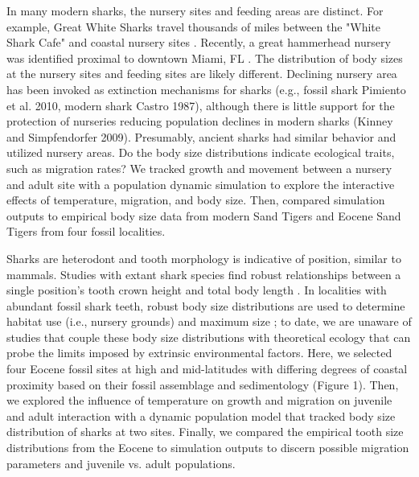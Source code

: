 \documentclass[]{rsos}%
\begin{document}
In many modern sharks, the nursery sites and feeding areas are distinct. 
For example, Great White Sharks travel thousands of miles between the "White Shark Cafe" and coastal nursery sites \cite{Jorgensen2010}. Recently, a great hammerhead nursery was identified proximal to downtown Miami, FL \cite{Macdonald2021}.
The distribution of body sizes at the nursery sites and feeding sites are likely different.
Declining nursery area has been invoked as extinction mechanisms for sharks (e.g., fossil shark Pimiento et al. 2010, modern shark Castro 1987), although there is little support for the protection of nurseries reducing population declines in modern sharks (Kinney and Simpfendorfer 2009).
Presumably, ancient sharks had similar behavior and utilized nursery areas.
Do the body size distributions indicate ecological traits, such as migration rates? 
We tracked growth and movement between a nursery and adult site with a  population dynamic simulation to explore the interactive effects of temperature, migration, and body size. 
Then, compared simulation outputs to empirical body size data from modern Sand Tigers and Eocene Sand Tigers from four fossil localities. 

Sharks are heterodont and tooth morphology is indicative of position, similar to mammals. 
Studies with extant shark species find robust relationships between a single position's tooth crown height and total body length \cite{Shimada2002, Shimada2004, Shimada2007}.  
In localities with abundant fossil shark teeth, robust body size distributions are used to determine habitat use (i.e., nursery grounds) and maximum size \cite{Pimiento2010, Shimada2020, Villafana2020}; to date, we are unaware of studies that couple these body size distributions with theoretical ecology that can probe the limits imposed by extrinsic environmental factors.
Here, we selected four Eocene fossil sites at high and mid-latitudes with differing degrees of coastal proximity based on their fossil assemblage and sedimentology (Figure 1).
Then, we explored the influence of temperature on growth and migration on  juvenile and adult interaction with a dynamic population model that tracked body size distribution of sharks at two sites.
Finally, we compared the empirical tooth size distributions from the Eocene to simulation outputs to discern possible migration parameters and juvenile vs. adult populations.
\end{document}
